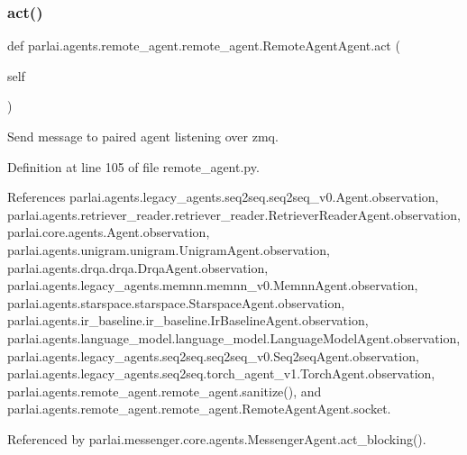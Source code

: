 \subsubsection{\texorpdfstring{act()}{act()}}
{\footnotesize\ttfamily def parlai.\+agents.\+remote\+\_\+agent.\+remote\+\_\+agent.\+Remote\+Agent\+Agent.\+act (\begin{DoxyParamCaption}\item[{}]{self }\end{DoxyParamCaption})}

\begin{DoxyVerb}Send message to paired agent listening over zmq.\end{DoxyVerb}
 

Definition at line 105 of file remote\+\_\+agent.\+py.



References parlai.\+agents.\+legacy\+\_\+agents.\+seq2seq.\+seq2seq\+\_\+v0.\+Agent.\+observation, parlai.\+agents.\+retriever\+\_\+reader.\+retriever\+\_\+reader.\+Retriever\+Reader\+Agent.\+observation, parlai.\+core.\+agents.\+Agent.\+observation, parlai.\+agents.\+unigram.\+unigram.\+Unigram\+Agent.\+observation, parlai.\+agents.\+drqa.\+drqa.\+Drqa\+Agent.\+observation, parlai.\+agents.\+legacy\+\_\+agents.\+memnn.\+memnn\+\_\+v0.\+Memnn\+Agent.\+observation, parlai.\+agents.\+starspace.\+starspace.\+Starspace\+Agent.\+observation, parlai.\+agents.\+ir\+\_\+baseline.\+ir\+\_\+baseline.\+Ir\+Baseline\+Agent.\+observation, parlai.\+agents.\+language\+\_\+model.\+language\+\_\+model.\+Language\+Model\+Agent.\+observation, parlai.\+agents.\+legacy\+\_\+agents.\+seq2seq.\+seq2seq\+\_\+v0.\+Seq2seq\+Agent.\+observation, parlai.\+agents.\+legacy\+\_\+agents.\+seq2seq.\+torch\+\_\+agent\+\_\+v1.\+Torch\+Agent.\+observation, parlai.\+agents.\+remote\+\_\+agent.\+remote\+\_\+agent.\+sanitize(), and parlai.\+agents.\+remote\+\_\+agent.\+remote\+\_\+agent.\+Remote\+Agent\+Agent.\+socket.



Referenced by parlai.\+messenger.\+core.\+agents.\+Messenger\+Agent.\+act\+\_\+blocking().


